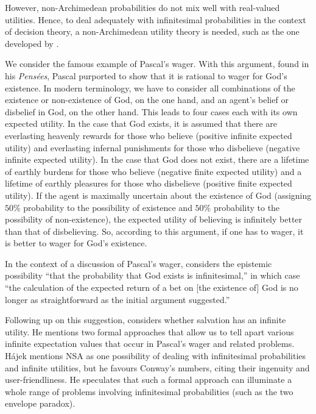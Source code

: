 However, non-Archimedean probabilities do not mix well with real-valued utilities. Hence, to deal adequately with infinitesimal probabilities in the context of decision theory, a non-Archimedean utility theory is needed, such as the one developed by \citet{Pivato:2014}.

We consider the famous example of Pascal's wager. With this argument, found in his \textit{Pens{\'e}es}, Pascal purported to show that it is rational to wager for God's existence. In modern terminology, we have to consider all combinations of the existence or non-existence of God, on the one hand, and an agent's belief or disbelief in God, on the other hand. This leads to four cases each with its own expected utility. In the case that God exists, it is assumed that there are everlasting heavenly rewards for those who believe (positive infinite expected utility) and everlasting infernal punishments for those who disbelieve (negative infinite expected utility). In the case that God does not exist, there are a lifetime of earthly burdens for those who believe (negative finite expected utility) and a lifetime of earthly pleasures for those who disbelieve (positive finite expected utility). If the agent is maximally uncertain about the existence of God (assigning $50\%$ probability to the possibility of existence and $50\%$ probability to the possibility of non-existence), the expected utility of believing is infinitely better than that of disbelieving. So, according to this argument, if one has to wager, it is better to wager for God's existence.

In the context of a discussion of Pascal's wager, \citet[p.~163]{Oppy:1990} considers the epistemic possibility ``that the probability that God exists is infinitesimal,'' in which case ``the calculation of the expected return of a bet on [the existence of] God is no longer as straightforward as the initial argument suggested.''

Following up on this suggestion, \citet{Hajek:2003b} considers whether salvation has an infinite utility. He mentions two formal approaches that allow us to tell apart various infinite expectation values that occur in Pascal's wager and related problems. H\'ajek mentions NSA as one possibility of dealing with infinitesimal probabilities and infinite utilities, but he favours Conway's numbers, citing their ingenuity and user-friendliness. He speculates that such a formal approach can illuminate a whole range of problems involving infinitesimal probabilities (such as the two envelope paradox).

